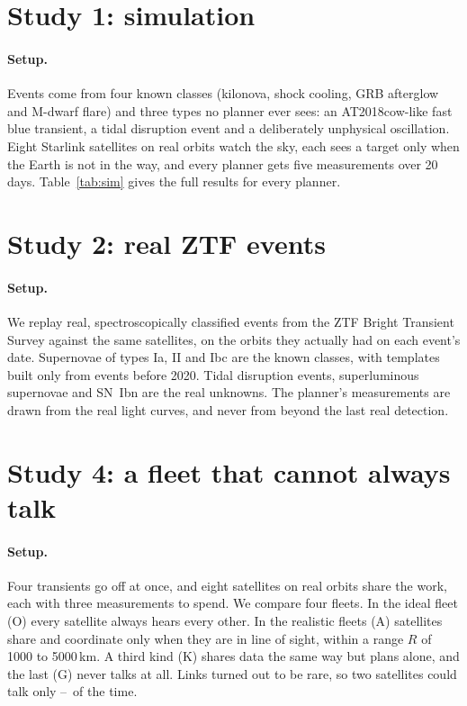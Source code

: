 \documentclass{jaa}
\begin{document}
\section{Study 1: simulation}\label{sec:sim}
\paragraph{Setup.} Events come from four known classes (kilonova, shock cooling, GRB afterglow and M-dwarf flare) and three types no planner ever sees: an AT2018cow-like fast blue transient, a tidal disruption event and a deliberately unphysical oscillation. Eight Starlink satellites on real orbits watch the sky, each sees a target only when the Earth is not in the way, and every planner gets five measurements over 20 days. Table~\ref{tab:sim} gives the full results for every planner.



\section{Study 2: real ZTF events}\label{sec:real}
\paragraph{Setup.} We replay real, spectroscopically classified events from the ZTF Bright Transient Survey \citep{Fremling2020,Perley2020} against the same satellites, on the orbits they actually had on each event's date. Supernovae of types Ia, II and Ibc are the known classes, with templates built only from events before 2020. Tidal disruption events, superluminous supernovae and SN~Ibn are the real unknowns. The planner's measurements are drawn from the real light curves, and never from beyond the last real detection.





\section{Study 4: a fleet that cannot always talk}\label{sec:fleet}

\paragraph{Setup.} Four transients go off at once, and eight satellites on real orbits share the work, each with three measurements to spend. We compare four fleets. In the ideal fleet (O) every satellite always hears every other. In the realistic fleets (A) satellites share and coordinate only when they are in line of sight, within a range $R$ of 1000 to 5000\,km. A third kind (K) shares data the same way but plans alone, and the last (G) never talks at all. Links turned out to be rare, so two satellites could talk only \FleetLinkUpOne--\FleetLinkUpFive\ of the time.
\end{document}
